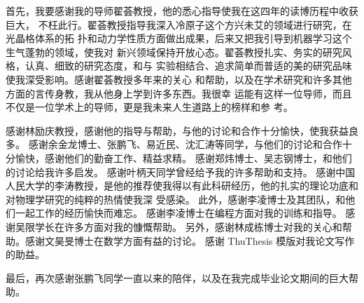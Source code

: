 \begin{acknowledgement}

首先，我要感谢我的导师翟荟教授，他的悉心指导使我在这四年的读博历程中收获巨大，
不枉此行。翟荟教授指导我深入冷原子这个方兴未艾的领域进行研究，在光晶格体系的拓
扑和动力学性质方面做出成果，后来又把我引导到机器学习这个生气蓬勃的领域，使我对
新兴领域保持开放心态。翟荟教授扎实、务实的研究风格，认真、细致的研究态度，和与
实验相结合、追求简单而普适的美的研究品味使我深受影响。感谢翟荟教授多年来的关心
和帮助，以及在学术研究和许多其他方面的言传身教，我从他身上学到许多东西。我很幸
运能有这样一位导师，而且不仅是一位学术上的导师，更是我未来人生道路上的榜样和参
考。

感谢林励庆教授，感谢他的指导与帮助，与他的讨论和合作十分愉快，使我获益良多。
感谢余金龙博士、张鹏飞、易近民、沈汇涛等同学，与他们的讨论和合作十分愉快，感谢他们的勤奋工作、精益求精。
感谢郑炜博士、吴志钢博士，和他们的讨论给我许多启发。
感谢叶柄天同学曾经给予我的许多帮助和支持。
感谢中国人民大学的李涛教授，是他的推荐使我得以有此科研经历，他的扎实的理论功底和对物理学研究的纯粹的热情使我深
受感染。
此外，感谢李凌博士及其团队，和他们一起工作的经历愉快而难忘。
感谢李凌博士在编程方面对我的训练和指导。
感谢吴限学长在许多方面对我的慷慨帮助。
另外，感谢林成栋博士对我的关心和帮助。感谢文昊旻博士在数学方面有益的讨论。
感谢 ThuThesis 模版对我论文写作的助益。


最后，再次感谢张鹏飞同学一直以来的陪伴，以及在我完成毕业论文期间的巨大帮助。

\end{acknowledgement}
